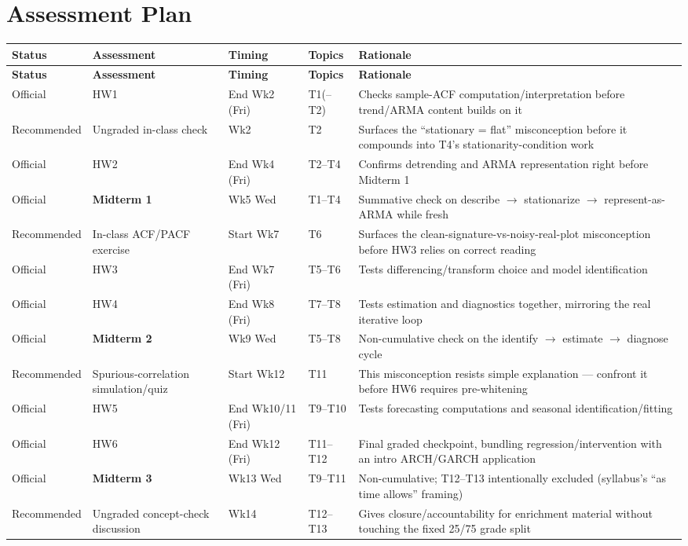 \documentclass[11pt]{article}
\begin{document}
\section{Assessment Plan}

\begin{longtable}{p{1.6cm} p{2.4cm} p{2.0cm} p{1.6cm} p{6.4cm}}
\toprule
\textbf{Status} & \textbf{Assessment} & \textbf{Timing} & \textbf{Topics} & \textbf{Rationale} \\
\midrule
\endfirsthead
\toprule
\textbf{Status} & \textbf{Assessment} & \textbf{Timing} & \textbf{Topics} & \textbf{Rationale} \\
\midrule
\endhead
\bottomrule
\endfoot
Official & HW1 & End Wk2 (Fri) & T1(--T2) & Checks sample-ACF computation/interpretation before trend/ARMA content builds on it \\
Recommended & Ungraded in-class check & Wk2 & T2 & Surfaces the ``stationary = flat'' misconception before it compounds into T4's stationarity-condition work \\
Official & HW2 & End Wk4 (Fri) & T2--T4 & Confirms detrending and ARMA representation right before Midterm 1 \\
Official & \textbf{Midterm 1} & Wk5 Wed & T1--T4 & Summative check on describe $\to$ stationarize $\to$ represent-as-ARMA while fresh \\
Recommended & In-class ACF/PACF exercise & Start Wk7 & T6 & Surfaces the clean-signature-vs-noisy-real-plot misconception before HW3 relies on correct reading \\
Official & HW3 & End Wk7 (Fri) & T5--T6 & Tests differencing/transform choice and model identification \\
Official & HW4 & End Wk8 (Fri) & T7--T8 & Tests estimation and diagnostics together, mirroring the real iterative loop \\
Official & \textbf{Midterm 2} & Wk9 Wed & T5--T8 & Non-cumulative check on the identify $\to$ estimate $\to$ diagnose cycle \\
Recommended & Spurious-correlation simulation/quiz & Start Wk12 & T11 & This misconception resists simple explanation --- confront it before HW6 requires pre-whitening \\
Official & HW5 & End Wk10/11 (Fri) & T9--T10 & Tests forecasting computations and seasonal identification/fitting \\
Official & HW6 & End Wk12 (Fri) & T11--T12 & Final graded checkpoint, bundling regression/intervention with an intro ARCH/GARCH application \\
Official & \textbf{Midterm 3} & Wk13 Wed & T9--T11 & Non-cumulative; T12--T13 intentionally excluded (syllabus's ``as time allows'' framing) \\
Recommended & Ungraded concept-check discussion & Wk14 & T12--T13 & Gives closure/accountability for enrichment material without touching the fixed 25/75 grade split \\
\end{longtable}
\end{document}
